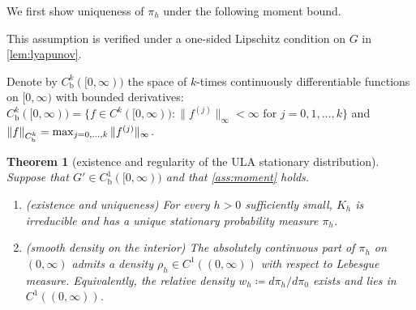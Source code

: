 \documentclass[aap,preprint]{imsart}
\DeclarePairedDelimiter{\Vpair}{\|}{\|} %
\newcommand\norm[2][0pt]{\Vpair*{#2}} %
\numberwithin{equation}{section}
\theoremstyle{plain}
\newtheorem{theorem}{Theorem}[section]
\theoremstyle{definition}
\newtheorem{assumption}[theorem]{Assumption}
\begin{document}
We first show uniqueness of $\pi_h$ under the following moment bound.

This assumption is verified under a one-sided Lipschitz condition on $G$ in \cref{lem:lyapunov}.

Denote by $C^k_{\mathrm b}([0,\infty))$ the space of $k$-times continuously
differentiable functions on $[0,\infty)$ with bounded derivatives:
\(
  C^k_{\mathrm b}([0,\infty)) = \{f\in C^k([0,\infty)) \colon
  \|f^{(j)}\|_\infty < \infty \text{ for } j=0,1,\ldots,k\}
\) and $\norm{f}_{C^k_{\mathrm b}} = \max_{j=0,\ldots,k} \|f^{(j)}\|_\infty$.
\begin{theorem}[existence and regularity of the ULA stationary distribution]\label{thm:ula-exists} Suppose that $G' \in C^1_{\mathrm b}([0,\infty))$ and that \cref{ass:moment} holds.

  \begin{enumerate}[label=\textup{(\roman*)}]
    \item \textup{(existence and uniqueness)}
      For every $h > 0$ sufficiently small, $K_h$ is irreducible and has a unique stationary probability measure $\pi_h$.

    \item \textup{(smooth density on the interior)}
      The absolutely continuous part of $\pi_h$ on $(0,\infty)$ admits a density $\rho_h \in C^1((0,\infty))$ with respect to Lebesgue measure.  Equivalently, the relative density $w_h \coloneqq d\pi_h/d\pi_0$ exists and lies in $C^1((0,\infty))$.
  \end{enumerate}
\end{theorem}
\end{document}
